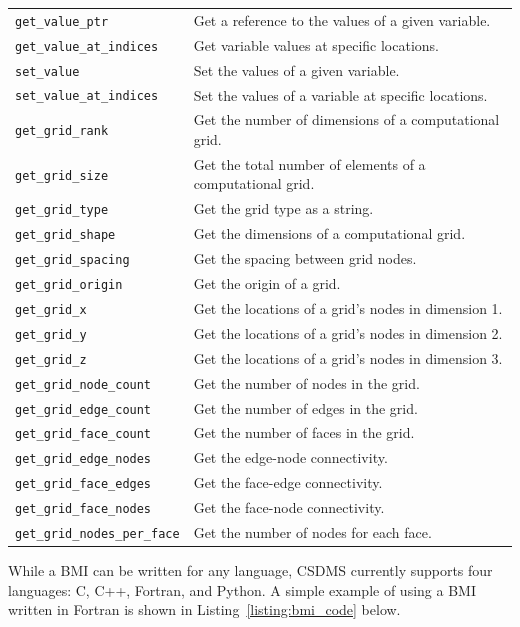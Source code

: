 \documentclass[12pt]{amsart}
\begin{document}
\begin{table}[htbp]
\begin{tabular}{ll}
        \verb|get_value_ptr| & Get a reference to the values of a given variable. \\
        \verb|get_value_at_indices| & Get variable values at specific locations. \\
        \verb|set_value| & Set the values of a given variable. \\
        \verb|set_value_at_indices| & Set the values of a variable at specific locations. \\
        \verb|get_grid_rank| & Get the number of dimensions of a computational grid. \\
        \verb|get_grid_size| & Get the total number of elements of a computational grid. \\
        \verb|get_grid_type| & Get the grid type as a string. \\
        \verb|get_grid_shape| & Get the dimensions of a computational grid. \\
        \verb|get_grid_spacing| & Get the spacing between grid nodes. \\
        \verb|get_grid_origin| & Get the origin of a grid. \\
        \verb|get_grid_x| & Get the locations of a grid’s nodes in dimension 1. \\
        \verb|get_grid_y| & Get the locations of a grid’s nodes in dimension 2. \\
        \verb|get_grid_z| & Get the locations of a grid’s nodes in dimension 3. \\
        \verb|get_grid_node_count| & Get the number of nodes in the grid. \\
        \verb|get_grid_edge_count| & Get the number of edges in the grid. \\
        \verb|get_grid_face_count| & Get the number of faces in the grid. \\
        \verb|get_grid_edge_nodes| & Get the edge-node connectivity. \\
        \verb|get_grid_face_edges| & Get the face-edge connectivity. \\
        \verb|get_grid_face_nodes| & Get the face-node connectivity. \\
        \verb|get_grid_nodes_per_face| & Get the number of nodes for each face. \\
    \hline
   \end{tabular}
   \label{tab:bmi}
\end{table}

While a BMI can be written for any language,
CSDMS currently supports four languages: C, C++, Fortran, and Python.
A simple example of using a BMI written in Fortran
is shown in Listing~\ref{listing:bmi_code} below.
\end{document}
